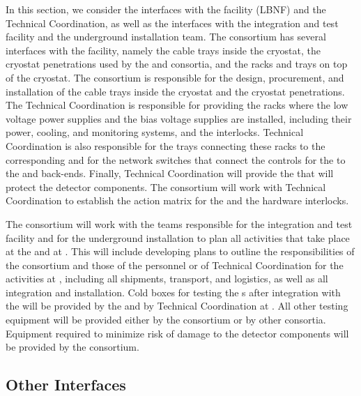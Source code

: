 In this section, we consider the interfaces with the facility (LBNF)
and the  Technical Coordination, as well as the interfaces with
the integration and test facility and the underground
installation team. The  consortium has several
interfaces with the facility, namely the cable trays inside the
cryostat, the cryostat penetrations used by the 
and  consortia, and the racks and trays on top
of the cryostat. The  consortium is responsible
for the design, procurement, and installation of the cable trays
inside the cryostat and the cryostat penetrations. The 
Technical Coordination is responsible for providing the racks
where the low voltage power supplies and the bias voltage supplies are installed,
including their power, cooling, and monitoring systems, and the interlocks.
Technical Coordination is also responsible for the trays connecting these racks 
to the corresponding  and for the network switches that
connect the controls for the  to the
 and  back-ends. Finally, Technical Coordination will
provide the  that will protect
the  detector components. The 
consortium will work with Technical Coordination to establish
the action matrix for the  and the hardware
interlocks.

The  consortium will work with the teams responsible
for the integration and test facility and for the underground installation
to plan all activities that take place at the  and at
. This will include developing plans to outline the responsibilities
of the consortium and those of the  personnel or of 
Technical Coordination for the activities at , including all 
shipments, transport, and logistics, as well as all
integration and installation. Cold boxes for testing
the s after integration with the  will be 
provided by the  and by Technical Coordination at .
All other testing equipment will be provided either by the 
consortium or by other consortia. Equipment required to
minimize risk of  damage to the detector components
will  be provided by the  consortium. 

\subsection{Other Interfaces}
\label{sec:fdsp-tpcelec-interfaces-other}

